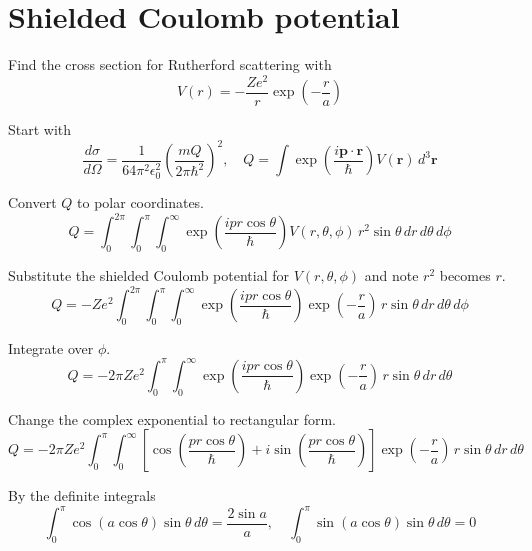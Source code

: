 

\section*{Shielded Coulomb potential}

Find the cross section for Rutherford scattering with
\begin{equation*}
V(r)=-\frac{Ze^2}{r}\exp\left(-\frac{r}{a}\right)
\end{equation*}

Start with
\begin{equation*}
\frac{d\sigma}{d\Omega}=\frac{1}{64\pi^2\epsilon_0^2}
\left(\frac{mQ}{2\pi\hbar^2}\right)^2,\quad
Q=\int\exp\left(\frac{i\mathbf p\cdot\mathbf r}{\hbar}\right)V(\mathbf r)\,d^3\mathbf r
\end{equation*}

Convert $Q$ to polar coordinates.
\begin{equation*}
Q=\int_0^{2\pi}
\int_0^\pi
\int_0^\infty
\exp\left(\frac{ipr\cos\theta}{\hbar}\right)V(r,\theta,\phi)
\,r^2\sin\theta\,dr\,d\theta\,d\phi
\end{equation*}

Substitute the shielded Coulomb potential for $V(r,\theta,\phi)$ and note $r^2$ becomes $r$.
\begin{equation*}
Q=-Ze^2
\int_0^{2\pi}
\int_0^\pi
\int_0^\infty
\exp\left(\frac{ipr\cos\theta}{\hbar}\right)
\exp\left(-\frac{r}{a}\right)
\,r\sin\theta\,dr\,d\theta\,d\phi
\end{equation*}

Integrate over $\phi$.
\begin{equation*}
Q=-2\pi Ze^2
\int_0^\pi
\int_0^\infty
\exp\left(\frac{ipr\cos\theta}{\hbar}\right)
\exp\left(-\frac{r}{a}\right)
\,r\sin\theta\,dr\,d\theta
\end{equation*}

Change the complex exponential to rectangular form.
\begin{equation*}
Q=-2\pi Ze^2
\int_0^\pi
\int_0^\infty
\left[
\cos\left(\frac{pr\cos\theta}{\hbar}\right)
+i\sin\left(\frac{pr\cos\theta}{\hbar}\right)
\right]
\exp\left(-\frac{r}{a}\right)
\,r\sin\theta\,dr\,d\theta
\end{equation*}

By the definite integrals
\begin{equation*}
\int_0^\pi\cos(a\cos\theta)\sin\theta\,d\theta=\frac{2\sin a}{a},\quad
\int_0^\pi\sin(a\cos\theta)\sin\theta\,d\theta=0
\end{equation*}

